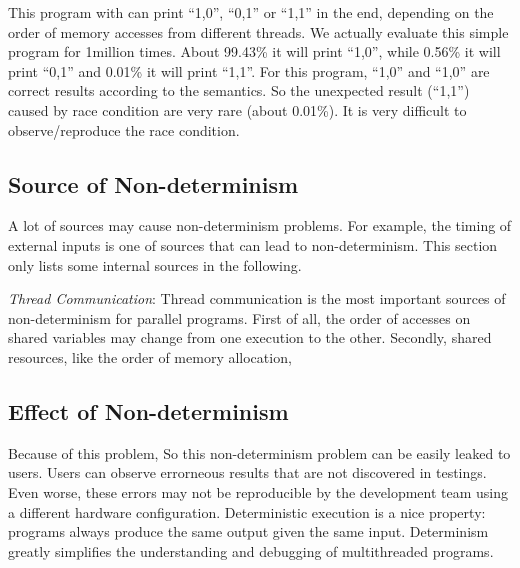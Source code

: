 This program with \pthreads{} can print ``1,0'', ``0,1'' or ``1,1'' in the end, 
depending on the order of memory accesses from different threads. We actually 
evaluate this simple program for 1million times.  
About 99.43\% it will print ``1,0'', while 0.56\% it will print ``0,1''
and 0.01\% it will print ``1,1''.
For this program, ``1,0'' and ``1,0'' are correct results according to the semantics. 
So the unexpected result (``1,1'') caused by race condition are very rare (about 0.01\%). 
It is very difficult to observe/reproduce the race condition.

\subsection{Source of Non-determinism}
A lot of sources may cause non-determinism problems. 
For example, the timing of external inputs is one of sources that can lead to 
non-determinism. This section only lists some internal sources in the following. 
 
\emph{Thread Communication}: 
Thread communication is the most important sources of non-determinism for parallel programs. 
First of all, the order of accesses on shared variables may change from one execution to the other. 
Secondly, shared resources, like the order of memory allocation,   

\subsection{Effect of Non-determinism}
Because of this problem, 
So this non-determinism problem can be easily leaked to users.
Users can observe errorneous results that are not discovered in testings. 
Even worse, these errors may not be reproducible by the development team using
a different hardware configuration. 
Deterministic execution is a nice property: programs always produce 
the same output given the same input.
Determinism greatly simplifies the understanding and debugging of multithreaded programs.

